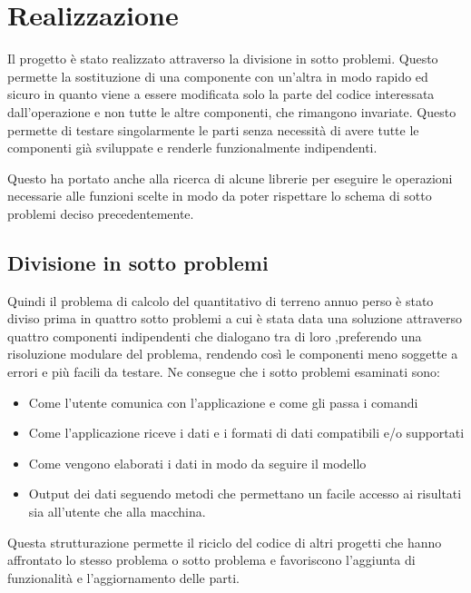 
\chapter{Realizzazione}
\label{cap:realizzazione}

Il progetto è stato realizzato attraverso la divisione in sotto problemi. Questo permette la sostituzione di una componente con un'altra in modo rapido ed sicuro in quanto viene a essere modificata solo la parte del codice interessata dall'operazione e non tutte le altre componenti, che rimangono invariate. Questo permette di testare singolarmente le parti senza necessità di avere tutte le componenti già sviluppate e renderle funzionalmente indipendenti.

Questo ha portato anche alla ricerca di alcune librerie per eseguire le operazioni necessarie alle funzioni scelte in modo da poter rispettare lo schema di sotto problemi deciso precedentemente.

\section{Divisione in sotto problemi}
Quindi il problema di calcolo del quantitativo di terreno annuo perso è stato diviso prima in quattro sotto problemi a cui è stata data una soluzione attraverso quattro componenti indipendenti che dialogano tra di loro ,preferendo una risoluzione modulare del problema, rendendo così le componenti meno soggette a errori e più facili da testare.
Ne consegue che i sotto problemi esaminati sono:
\begin{itemize}
\item Come l'utente comunica con l'applicazione e come gli passa i comandi
\item Come l'applicazione riceve i dati e i formati di dati compatibili e/o supportati
\item Come vengono elaborati i dati in modo da seguire il modello \rusle
\item Output dei dati seguendo metodi che permettano un facile accesso ai risultati sia all'utente che alla macchina.
\end{itemize}

Questa strutturazione permette il riciclo del codice di altri progetti che hanno affrontato lo stesso problema o sotto problema e favoriscono l'aggiunta di funzionalità e l'aggiornamento delle parti. 

